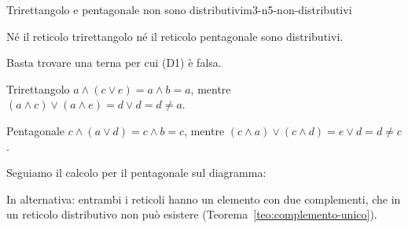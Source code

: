 \begin{concetto}
\begin{Proposizione}{Trirettangolo e pentagonale non sono distributivi}{m3-n5-non-distributivi}
    \begin{prerequisiti}
    \end{prerequisiti}
    Né il reticolo trirettangolo né il reticolo pentagonale sono distributivi.
\end{Proposizione}
\begin{dimostrazione}
    Basta trovare una terna per cui (D1) è falsa.
    \begin{caso}{Trirettangolo}
        $a \wedge (c \vee e) = a \wedge b = a$, mentre $(a \wedge c) \vee (a \wedge e) = d \vee d = d \neq a$.
    \end{caso}
    \begin{caso}{Pentagonale}
        $c \wedge (a \vee d) = c \wedge b = c$, mentre $(c \wedge a) \vee (c \wedge d) = e \vee d = d \neq c$.
    \end{caso}
\end{dimostrazione}
\end{concetto}

\begin{spiegazione}
    Seguiamo il calcolo per il pentagonale sul diagramma:
    \begin{center}
    \end{center}
    In alternativa: entrambi i reticoli hanno un elemento con due complementi, che in un reticolo distributivo non può esistere (Teorema~\ref{teo:complemento-unico}).
\end{spiegazione}

